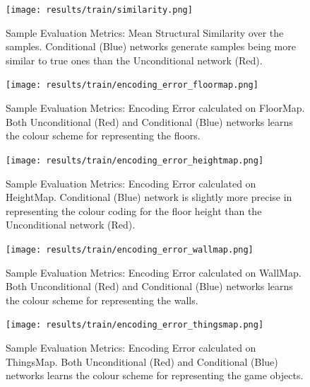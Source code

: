 \begin{figure}[!htb] 
	\begin{minipage}[b]{\linewidth}
		\centering
		\texttt{[image: results/train/similarity.png]} 
		\caption[Sample Evaluation Metrics: Mean Structural Similarity Index]{Sample Evaluation Metrics: Mean Structural Similarity over the samples. Conditional (Blue) networks generate samples being more similar to true ones than the Unconditional network (Red).}
		\label{fig:train-similarity}
	\end{minipage}
\end{figure}


\begin{figure}[!htb] 
	\begin{minipage}[t]{0.45\linewidth}
		\centering
		\texttt{[image: results/train/encoding\_error\_floormap.png]} 
		\caption[Sample Evaluation Metrics: Encoding Error (Floormap)]{Sample Evaluation Metrics: Encoding Error calculated on FloorMap. Both Unconditional (Red) and Conditional (Blue) networks learns the colour scheme for representing the floors.}
		\label{fig:train-encoding_error-floormap}
	\end{minipage}
	\hfil
	\begin{minipage}[t]{0.45\linewidth}
		\centering
		\texttt{[image: results/train/encoding\_error\_heightmap.png]} 
		\caption[Sample Evaluation Metrics: Encoding Error (HeightMap)]{Sample Evaluation Metrics: Encoding Error calculated on HeightMap. Conditional (Blue) network is slightly more precise in representing the colour coding for the floor height than the Unconditional network (Red).}
		\label{fig:train-encoding-error-heightmap}
	\end{minipage}
	
	\begin{minipage}[t]{0.45\linewidth}
		\centering
		\texttt{[image: results/train/encoding\_error\_wallmap.png]} 
		\caption[Sample Evaluation Metrics: Encoding Error (WallMap)]{Sample Evaluation Metrics: Encoding Error calculated on WallMap. Both Unconditional (Red) and Conditional (Blue) networks learns the colour scheme for representing the walls.}
		\label{fig:train-encoding-error-wallmap}
	\end{minipage}
	\hfil
	\begin{minipage}[t]{0.45\linewidth}
		\centering
		\texttt{[image: results/train/encoding\_error\_thingsmap.png]} 
		\caption[Sample Evaluation Metrics: Encoding Error (ThingsMap)]{Sample Evaluation Metrics: Encoding Error calculated on ThingsMap. Both Unconditional (Red) and Conditional (Blue) networks learns the colour scheme for representing the game objects.}
		\label{fig:train-encoding-error-thingsmap}
	\end{minipage}
\end{figure}

